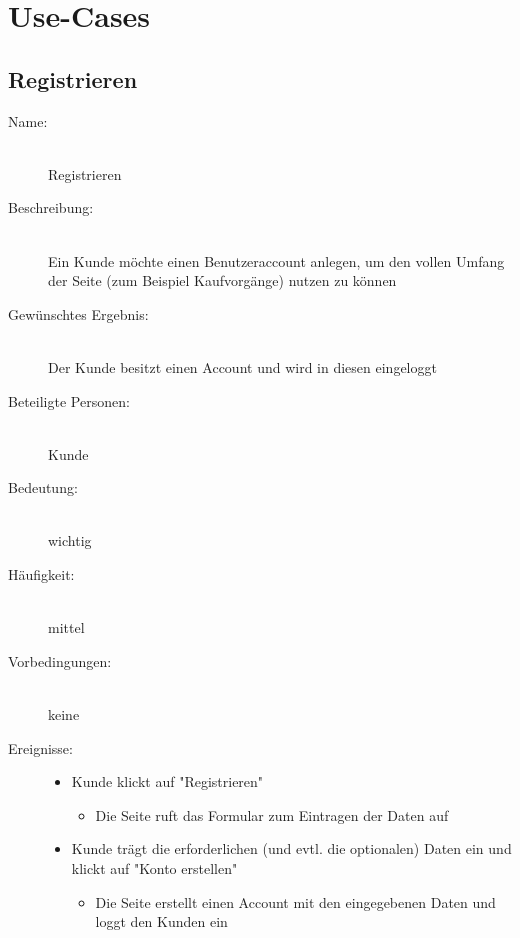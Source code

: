\documentclass[a4paper]{article}
\begin{document}
\section{Use-Cases}
\subsection{Registrieren}
\begin{description}
	\item[Name:]\hfill \\
	Registrieren
	\item[Beschreibung:]\hfill \\ 
	Ein Kunde möchte einen Benutzeraccount anlegen, um den vollen Umfang der Seite (zum Beispiel Kaufvorgänge) nutzen zu können
	\item[Gewünschtes Ergebnis:]\hfill \\ 
	Der Kunde besitzt einen Account und wird in diesen eingeloggt
	\item[Beteiligte Personen:]\hfill \\ 
	Kunde
	\item[Bedeutung:]\hfill \\ 
	wichtig
	\item[Häufigkeit:]\hfill \\ 
	mittel
	\item[Vorbedingungen:]\hfill \\ 
	keine
	\item[Ereignisse:]\hfill
	\begin{itemize}
		\item Kunde klickt auf "Registrieren"
		\begin{itemize}
			\item Die Seite ruft das Formular zum Eintragen der Daten auf
		\end{itemize}
		\item Kunde trägt die erforderlichen (und evtl. die optionalen) Daten ein und klickt auf "Konto erstellen"
		\begin{itemize}
			\item Die Seite erstellt einen Account mit den eingegebenen Daten und loggt den Kunden ein
		\end{itemize}
	\end{itemize}
\end{description}
\end{document}
